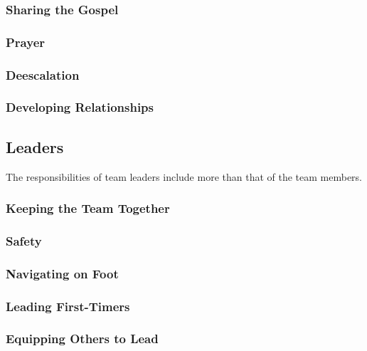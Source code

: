 \documentclass[12pt]{article}
\begin{document}
\subsubsection{Sharing the Gospel}

\qGreatCommission

\subsubsection{Prayer}
\subsubsection{Deescalation}
\subsubsection{Developing Relationships}

\subsection{Leaders}

The responsibilities of team leaders include more than that of the team members.

\subsubsection{Keeping the Team Together}
\subsubsection{Safety}
\subsubsection{Navigating on Foot}
\subsubsection{Leading First-Timers}
\subsubsection{Equipping Others to Lead}




\end{document}
